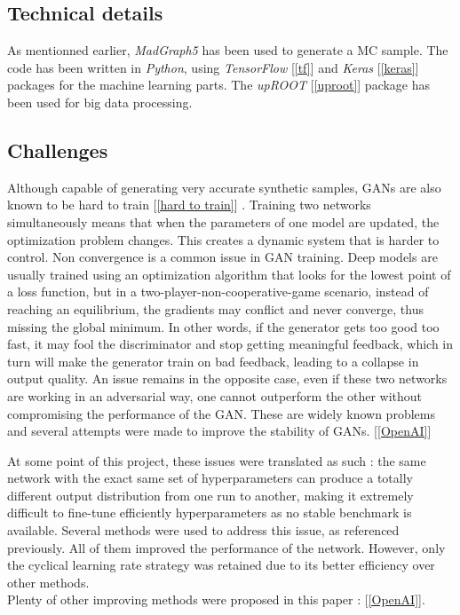 \documentclass [12pt] {article}
\numberwithin{equation}{section} %
\numberwithin{figure}{section}   %
\begin{document}
\subsection{Technical details}

As mentionned earlier, \textit{MadGraph5} has been used to generate a MC sample. The code has been written in \textit{Python}, using \textit{TensorFlow} [\ref{tf}] and \textit{Keras} [\ref{keras}] packages for the machine learning parts. The \textit{upROOT} [\ref{uproot}] package has been used for big data processing.

\subsection{Challenges}

Although capable of generating very accurate synthetic samples, GANs are also known to be hard to train [\ref{hard to train}] . Training two networks simultaneously means that when the parameters of one model are updated, the optimization problem changes. This creates a dynamic system that is harder to control. Non convergence is a common issue in GAN training. Deep models are usually trained using an optimization algorithm that looks for the lowest point of a loss function, but in a two-player-non-cooperative-game scenario, instead of reaching an equilibrium, the gradients may conflict and never converge, thus missing the global minimum. In other words, if the generator gets too good too fast, it may fool the discriminator and stop getting meaningful feedback, which in turn will make the generator train on bad feedback, leading to a collapse in output quality. An issue remains in the opposite case, even if these two networks are working in an adversarial way, one cannot outperform the other without compromising the performance of the GAN. These are widely known problems and several attempts were made to improve the stability of GANs. [\ref{OpenAI}]

At some point of this project, these issues were translated as such : the same network with the exact same set of hyperparameters can produce a totally different output distribution from one run to another, making it extremely difficult to fine-tune efficiently hyperparameters as no stable benchmark is available. Several methods were used to address this issue, as referenced previously. All of them improved the performance of the network. However, only the cyclical learning rate strategy was retained due to its better efficiency over other methods.\\ 
Plenty of other improving methods were proposed in this paper : [\ref{OpenAI}].\\
\end{document}
